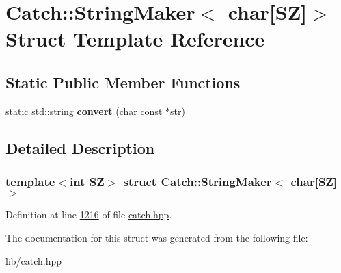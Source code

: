 \hypertarget{structCatch_1_1StringMaker_3_01char[SZ]_4}{}\section{Catch\+::String\+Maker$<$ char\mbox{[}SZ\mbox{]}$>$ Struct Template Reference}
\label{structCatch_1_1StringMaker_3_01char[SZ]_4}
\subsection*{Static Public Member Functions}
\begin{DoxyCompactItemize}
\item 
\mbox{\label{structCatch_1_1StringMaker_3_01char[SZ]_4_a095e415534f9145300271befe9853357}} 
static std\+::string {\bfseries convert} (char const $\ast$str)
\end{DoxyCompactItemize}


\subsection{Detailed Description}
\subsubsection*{template$<$int SZ$>$\newline
struct Catch\+::\+String\+Maker$<$ char\mbox{[}\+S\+Z\mbox{]}$>$}



Definition at line \mbox{\hyperlink{catch_8hpp_source_l01216}{1216}} of file \mbox{\hyperlink{catch_8hpp_source}{catch.\+hpp}}.



The documentation for this struct was generated from the following file\+:\begin{DoxyCompactItemize}
\item 
lib/catch.\+hpp\end{DoxyCompactItemize}
